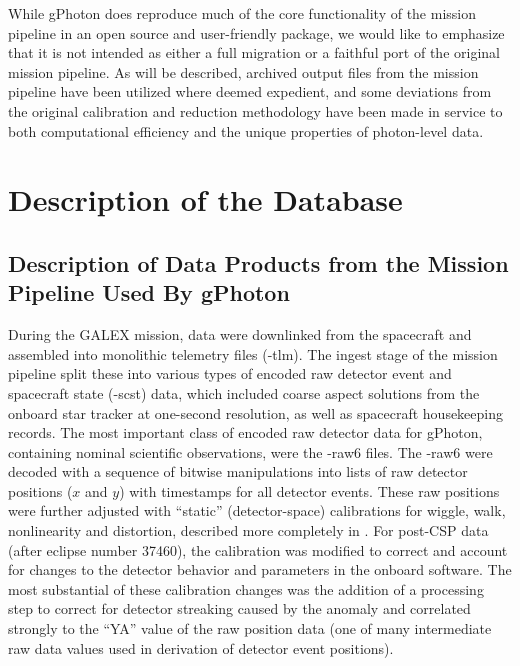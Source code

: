 \documentclass[5p]{elsarticle}
\begin{document}
While gPhoton does reproduce much of the core functionality of the mission pipeline in an open source and user-friendly package, we would like to emphasize that it is not intended as either a full migration or a faithful port of the original mission pipeline. As will be described, archived output files from the mission pipeline have been utilized where deemed expedient, and some deviations from the original calibration and reduction methodology have been made in service to both computational efficiency and the unique properties of photon-level data.

\section{Description of the Database}
\label{database}
\subsection{Description of Data Products from the Mission Pipeline Used By gPhoton}
During the GALEX mission, data were downlinked from the spacecraft and assembled into monolithic telemetry files (-tlm). The ingest stage of the mission pipeline split these into various types of encoded raw detector event and spacecraft state (-scst) data, which included coarse aspect solutions from the onboard star tracker at one-second resolution, as well as spacecraft housekeeping records. The most important class of encoded raw detector data for gPhoton, containing nominal scientific observations, were the -raw6 files. The -raw6 were decoded with a sequence of bitwise manipulations into lists of raw detector positions ($x$ and $y$) with timestamps for all detector events. These raw positions were further adjusted with ``static'' (detector-space) calibrations for wiggle, walk, nonlinearity and distortion, described more completely in \citet{mor2007}. For post-CSP data (after eclipse number 37460), the calibration was modified to correct and account for changes to the detector behavior and parameters in the onboard software. The most substantial of these calibration changes was the addition of a processing step to correct for detector streaking caused by the anomaly and correlated strongly to the “YA” value of the raw position data (one of many intermediate raw data values used in derivation of detector event positions).
\end{document}
